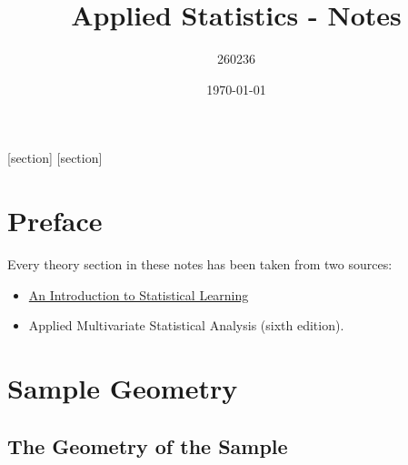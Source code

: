 \documentclass[a4paper]{article}
\begin{document}
    [section]
    [section]
    
    

    \author{260236}
	\title{Applied Statistics - Notes}
	\date{\printdayoff\today}
	\maketitle

	\newpage

    \section*{Preface}

    Every theory section in these notes has been taken from two sources:
    \begin{itemize}
        \item \href{https://www.statlearning.com/}{An Introduction to Statistical Learning}\cite{james2013introduction}
        \item Applied Multivariate Statistical Analysis (sixth edition).\cite{johnson2007applied}
    \end{itemize}
    
    \newpage
	
	\tableofcontents
	
	\newpage

    \section{Sample Geometry}

    \subsection{The Geometry of the Sample}
\end{document}
